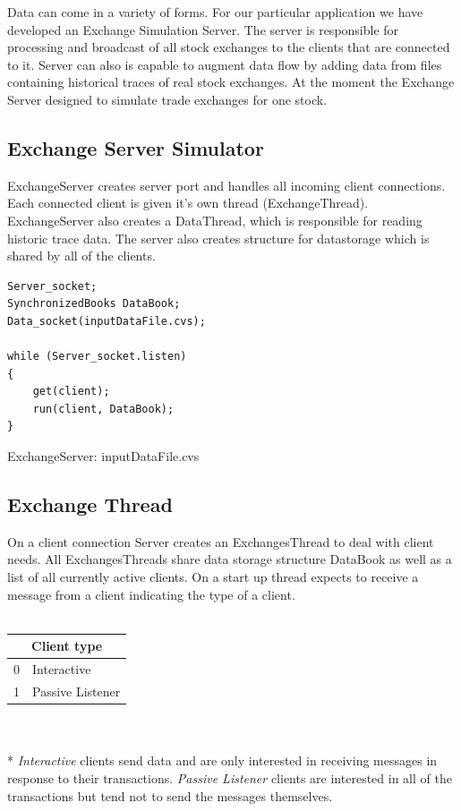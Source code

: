 \documentclass[11pt]{article}
\begin{document}
Data can come in a variety of forms. For our particular application we have developed an Exchange Simulation Server. The server is responsible for processing and broadcast of all stock exchanges to the clients that are connected to it. Server can also is capable to augment data flow by adding data from files containing historical traces of real stock exchanges. At the moment the Exchange Server designed to simulate trade exchanges for one stock.   

\subsection{Exchange Server Simulator}
ExchangeServer creates server port and handles all incoming client connections. Each connected client is given it's own thread (ExchangeThread). ExchangeServer also creates a DataThread, which is responsible for reading historic trace data. The server also creates structure for datastorage which is shared by all of the clients.

\begin{code}
  \begin{verbatim}
Server_socket;
SynchronizedBooks DataBook;
Data_socket(inputDataFile.cvs);

while (Server_socket.listen)
{
	get(client);
	run(client, DataBook);
}
  \end{verbatim}
  \caption{ExchangeServer: inputDataFile.cvs}
\end{code}



\subsection{Exchange Thread}
On a client connection Server creates an ExchangesThread to deal with client needs. All ExchangesThreads share data storage structure DataBook as well as a list of all currently active clients. On a start up thread expects to receive a message from a client indicating the type of a client.
\\
\\
\begin{tabular}{|l|l|}
  \hline
  \multicolumn{2}{|c|}{Client type} \\
  \hline
  0 & Interactive\\ \hline
  1 & Passive Listener \\
  \hline
\end{tabular}
\\
\\*
\emph{Interactive} clients send data and are only interested in receiving messages in response to their transactions. \emph{Passive Listener} clients are interested in all of the transactions but tend not to send the messages themselves.
\end{document}
